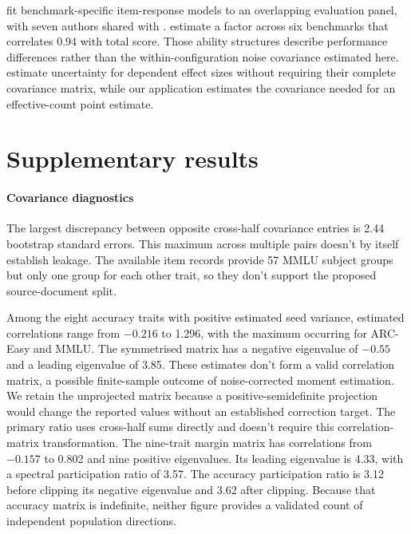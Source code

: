 \citet{hofmann2025} fit benchmark-specific item-response models to an overlapping evaluation panel, with seven authors shared with \citet{heineman2025}. \citet{kipnis2024} estimate a factor across six benchmarks that correlates 0.94 with total score. Those ability structures describe performance differences rather than the within-configuration noise covariance estimated here. \citet{hedges2010} estimate uncertainty for dependent effect sizes without requiring their complete covariance matrix, while our application estimates the covariance needed for an effective-count point estimate.

\section{Supplementary results}
\label{app:supplementary}

\paragraph{Covariance diagnostics}
The largest discrepancy between opposite cross-half covariance entries is 2.44 bootstrap standard errors. This maximum across multiple pairs doesn't by itself establish leakage. The available item records provide 57 MMLU subject groups but only one group for each other trait, so they don't support the proposed source-document split.

Among the eight accuracy traits with positive estimated seed variance, estimated correlations range from $-0.216$ to 1.296, with the maximum occurring for ARC-Easy and MMLU. The symmetrised matrix has a negative eigenvalue of $-0.55$ and a leading eigenvalue of 3.85. These estimates don't form a valid correlation matrix, a possible finite-sample outcome of noise-corrected moment estimation. We retain the unprojected matrix because a positive-semidefinite projection would change the reported values without an established correction target. The primary ratio uses cross-half sums directly and doesn't require this correlation-matrix transformation. The nine-trait margin matrix has correlations from $-0.157$ to 0.802 and nine positive eigenvalues. Its leading eigenvalue is 4.33, with a spectral participation ratio of 3.57. The accuracy participation ratio is 3.12 before clipping its negative eigenvalue and 3.62 after clipping. Because that accuracy matrix is indefinite, neither figure provides a validated count of independent population directions.

